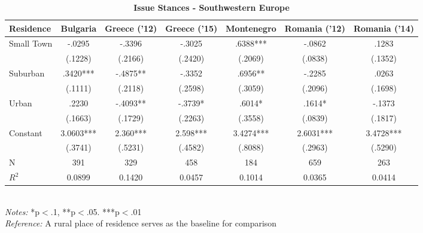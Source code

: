 \documentclass[12pt, titlepage]{article}
\newcommand\e{\emph}
\newcommand\tb{\textbf}
\begin{document}
\begin{landscape}
	\begin{table}
		\centering
		\def\arraystretch{1.5}
		\caption{\tb{Issue Stances - Southwestern Europe}}
		\begin{tabulary}{\linewidth}{l c c c c c c}
			\hline
			\tb{Residence}& \tb{Bulgaria}& \tb{Greece ('12)}& \tb{Greece ('15)} & \tb{Montenegro} & \tb{Romania ('12)} & \tb {Romania ('14)}\\
			\hline
			Small Town& -.0295&-.3396 &-.3025 &.6388*** & -.0862 &.1283  \\
			&(.1228) &(.2166)  &(.2420)  & (.2069) & (.0838)  & (.1352)  \\
			Suburban& .3420***&-.4875** &-.3352  & .6956** & -.2285  & .0263 \\
			&(.1111)& (.2118)  &(.2598)  &(.3059)  & (.2096) & (.1698) \\
			Urban&.2230& -.4093** & -.3739*  & .6014* & .1614* &-.1373  \\
			&(.1663)& (.1729) &(.2263)   & (.3558)  & (.0839) & (.1817)  \\
			Constant&3.0603***&2.360***  & 2.598*** & 3.4274*** &2.6031***  & 3.4728***  \\
			&(.3741)& (.5231)  &(.4582)  &(.8088)  & (.2963) & (.5290)  \\
			N&391 & 329  &458   & 184 & 659  &263  \\
			$R^2$&0.0899& 0.1420  &0.0457  & 0.1014 & 0.0365 & 0.0414 \\
			\hline
\end{tabulary}
\\
\e{Notes:} *p$<$.1, **p$<$.05. ***p$<$.01 \\
\e{Reference:} A rural place of residence serves as the baseline for comparison
\label{SWELib}
\end{table}
\end{landscape}
\end{document}
